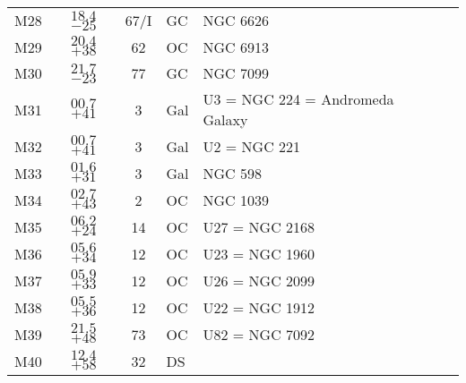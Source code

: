 \begin{table}[t]
\begin{tabular}{lcclll}
M28  &$18.4$ $-25$&67/I&GC &NGC 6626\\
M29  &$20.4$ $+38$&62&OC &NGC 6913\\
M30  &$21.7$ $-23$&77&GC &NGC 7099\\
M31  &$00.7$ $+41$&3&Gal&U3 = NGC 224 = Andromeda Galaxy\\
M32  &$00.7$ $+41$&3&Gal&U2 = NGC 221\\
M33  &$01.6$ $+31$&3&Gal&NGC 598\\
M34  &$02.7$ $+43$&2&OC &NGC 1039\\
M35  &$06.2$ $+24$&14&OC &U27 = NGC 2168\\
M36  &$05.6$ $+34$&12&OC &U23 = NGC 1960\\
M37  &$05.9$ $+33$&12&OC &U26 = NGC 2099\\
M38  &$05.5$ $+36$&12&OC &U22 = NGC 1912\\
M39  &$21.5$ $+48$&73&OC &U82 = NGC 7092\\
M40  &$12.4$ $+58$&32&DS &\\
\hline
\end{tabular}
\end{table}

